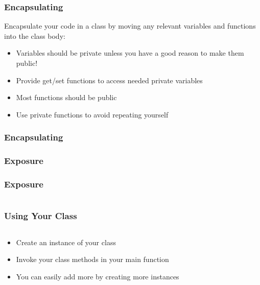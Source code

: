 \begin{frame}[fragile]
	\frametitle{Encapsulating}
	Encapsulate your code in a class by moving any relevant variables and functions into the class body:
	\begin{itemize}
		\item Variables should be private unless you have a good reason to make them public!
		\item Provide get/set functions to access needed private variables
		\item Most functions should be public
		\item Use private functions to avoid repeating yourself
	\end{itemize}
\end{frame}

\begin{frame}[fragile]
	\frametitle{Encapsulating}
	
\end{frame}

\begin{frame}
	\frametitle{Exposure}
\end{frame}

\begin{frame}[fragile]
	\frametitle{Exposure}
	\begin{columns}[T]
		\begin{column}{0.5\textwidth}
			
		\end{column}
		\begin{column}{0.5\textwidth}
			
		\end{column}
	\end{columns}
\end{frame}

\begin{frame}
	\frametitle{Using Your Class}
	\begin{columns}[T]
		\begin{column}{0.5\textwidth}
			\begin{itemize}
				\item Create an instance of your class
				\item Invoke your class methods in your main function
				\item You can easily add more by creating more instances
			\end{itemize}
		\end{column}
		\begin{column}{0.5\textwidth}
					
		\end{column}
	\end{columns}
\end{frame}